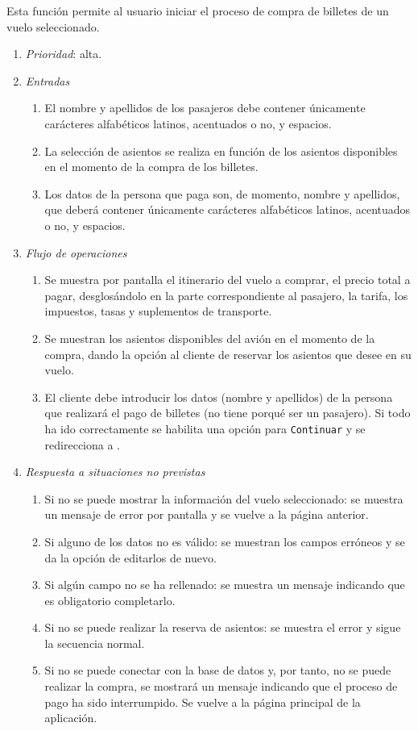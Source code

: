 

 \label{fun:comprarbillete}
	Esta función permite al usuario iniciar el proceso de compra de billetes de un vuelo seleccionado.		

	\begin{enumerate}
		\item \textit{Prioridad}: alta.	
		\item \textit{Entradas}
			\begin{enumerate}
				\item El nombre y apellidos de los pasajeros debe contener únicamente carácteres alfabéticos latinos, acentuados o no, y espacios.
				\item La selección de asientos se realiza en función de los asientos disponibles en el momento de la compra de los billetes.
				\item Los datos de la persona que paga son, de momento, nombre y apellidos,  que deberá contener únicamente carácteres alfabéticos latinos, acentuados o no, y espacios.							
			\end{enumerate}
		\item \textit{Flujo de operaciones}
			\begin{enumerate}
				\item Se muestra por pantalla el itinerario del vuelo a comprar, el precio total a pagar, desglosándolo en la parte correspondiente al pasajero, la tarifa, los impuestos, tasas y suplementos de transporte.
				\item Se muestran los asientos disponibles del avión en el momento de la compra, dando la opción al cliente de reservar los asientos que desee en su vuelo.
				\item El cliente debe introducir los datos (nombre y apellidos) de la persona que realizará el pago de billetes (no tiene porqué ser un pasajero). Si todo ha ido correctamente se habilita una opción para \verb|Continuar| y se redirecciona a .
			\end{enumerate}
		\item \textit{Respuesta a situaciones no previstas}
			\begin{enumerate}
				\item Si no se puede mostrar la información del vuelo seleccionado: se muestra un mensaje de error por pantalla y se vuelve a la página anterior.
				\item Si alguno de los datos no es válido: se muestran los campos erróneos y se da la opción de editarlos de nuevo.
				\item Si algún campo no se ha rellenado: se muestra un mensaje indicando que es obligatorio completarlo.
				\item Si no se puede realizar la reserva de asientos: se muestra el error y sigue la secuencia normal.
				\item Si no se puede conectar con la base de datos y, por tanto, no se puede realizar la compra,  se mostrará un mensaje indicando que el proceso de pago ha sido interrumpido. Se vuelve a la página principal de la aplicación.
			\end{enumerate}
	\end{enumerate}
								
